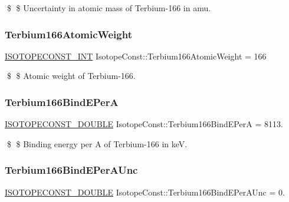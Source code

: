 \$ \$ Uncertainty in atomic mass of Terbium-\/166 in amu. \mbox{\label{group___isotope_const-_terbium-_tb166_gadd8dcc5ee57b5a400cae989f63278525}} 
\subsubsection{\texorpdfstring{Terbium166\+Atomic\+Weight}{Terbium166AtomicWeight}}
{\footnotesize\ttfamily \mbox{\hyperlink{group___isotope_const-_macros_ga5f18360b3e99483a35c32d789e62621c}{I\+S\+O\+T\+O\+P\+E\+C\+O\+N\+S\+T\+\_\+\+I\+NT}} Isotope\+Const\+::\+Terbium166\+Atomic\+Weight = 166}

\$ \$ Atomic weight of Terbium-\/166. \mbox{\label{group___isotope_const-_terbium-_tb166_ga1653ee851d9d50c932ca3df821eff6df}} 
\subsubsection{\texorpdfstring{Terbium166\+Bind\+E\+PerA}{Terbium166BindEPerA}}
{\footnotesize\ttfamily \mbox{\hyperlink{group___isotope_const-_macros_ga8f45a7272ce02c0b4c65c44636ed719a}{I\+S\+O\+T\+O\+P\+E\+C\+O\+N\+S\+T\+\_\+\+D\+O\+U\+B\+LE}} Isotope\+Const\+::\+Terbium166\+Bind\+E\+PerA = 8113.}

\$ \$ Binding energy per A of Terbium-\/166 in keV. \mbox{\label{group___isotope_const-_terbium-_tb166_gaa35730192e98e0d23735d517884ef537}} 
\subsubsection{\texorpdfstring{Terbium166\+Bind\+E\+Per\+A\+Unc}{Terbium166BindEPerAUnc}}
{\footnotesize\ttfamily \mbox{\hyperlink{group___isotope_const-_macros_ga8f45a7272ce02c0b4c65c44636ed719a}{I\+S\+O\+T\+O\+P\+E\+C\+O\+N\+S\+T\+\_\+\+D\+O\+U\+B\+LE}} Isotope\+Const\+::\+Terbium166\+Bind\+E\+Per\+A\+Unc = 0.}


